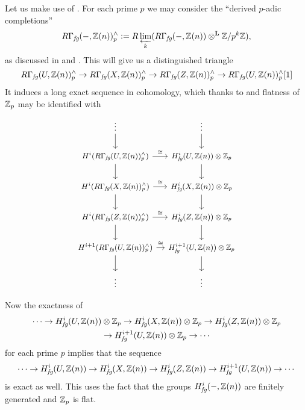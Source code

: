 \begin{nameless}
  \label{nameless:almost-a-triangle-RGammafg}
  Let us make use of
  . For each
  prime $p$ we may consider the ``derived $p$-adic completions''
  \[ R\Gamma_\text{\it fg} (-, \mathbb{Z}(n))^\wedge_p \mathrel{\mathop:}=
    R\varprojlim_k (R\Gamma_\text{\it fg} (-, \mathbb{Z}(n)) \otimes^\mathbf{L} \mathbb{Z}/p^k\mathbb{Z}), \]
  as discussed in \cite{Bhatt-Scholze-pro-etale} and
  \cite[Tag 091N]{stacks-project}. This will give us a distinguished triangle
  \[ R\Gamma_\text{\it fg} (U, \mathbb{Z}(n))^\wedge_p \to
    R\Gamma_\text{\it fg} (X, \mathbb{Z}(n))^\wedge_p \to
    R\Gamma_\text{\it fg} (Z, \mathbb{Z}(n))^\wedge_p \to
    R\Gamma_\text{\it fg} (U, \mathbb{Z}(n))^\wedge_p [1] \]
  It induces a long exact sequence in cohomology, which thanks to
  \cite[0A06]{stacks-project} and flatness of $\mathbb{Z}_p$ may be identified with
  \[ \begin{tikzcd}[column sep=1em, font=\small]
      \vdots \ar{d} & \vdots \ar{d} \\
      H^i (R\Gamma_\text{\it fg} (U, \ZZ(n))^\wedge_p) \ar{d}\ar{r}{\isom} & H^i_\text{\it fg} (U, \ZZ(n))\otimes \ZZ_p \ar{d} \\
      H^i (R\Gamma_\text{\it fg} (X, \ZZ(n))^\wedge_p) \ar{d}\ar{r}{\isom} & H^i_\text{\it fg} (X, \ZZ(n))\otimes \ZZ_p \ar{d} \\
      H^i (R\Gamma_\text{\it fg} (Z, \ZZ(n))^\wedge_p) \ar{d}\ar{r}{\isom} & H^i_\text{\it fg} (Z, \ZZ(n))\otimes \ZZ_p \ar{d} \\
      H^{i+1} (R\Gamma_\text{\it fg} (U, \ZZ(n))^\wedge_p) \ar{d}\ar{r}{\isom} & H^{i+1}_\text{\it fg} (U, \ZZ(n))\otimes \ZZ_p\ar{d} \\
      \vdots & \vdots
    \end{tikzcd} \]

  Now the exactness of
  \begin{multline*}
    \cdots \to H^i_\text{\it fg} (U, \mathbb{Z}(n))\otimes \mathbb{Z}_p \to
    H^i_\text{\it fg} (X, \mathbb{Z}(n))\otimes \mathbb{Z}_p \to
    H^i_\text{\it fg} (Z, \mathbb{Z}(n))\otimes \mathbb{Z}_p \\
    \to H^{i+1}_\text{\it fg} (U, \mathbb{Z}(n))\otimes \mathbb{Z}_p \to \cdots
  \end{multline*}
  for each prime $p$ implies that the sequence
  \[ \cdots \to H^i_\text{\it fg} (U, \mathbb{Z}(n)) \to
    H^i_\text{\it fg} (X, \mathbb{Z}(n)) \to
    H^i_\text{\it fg} (Z, \mathbb{Z}(n)) \to
    H^{i+1}_\text{\it fg} (U, \mathbb{Z}(n)) \to \cdots \]
  is exact as well. This uses the fact that the groups
  $H^i_\text{\it fg} (-, \mathbb{Z}(n))$ are finitely generated and $\mathbb{Z}_p$ is flat.


\end{nameless}
